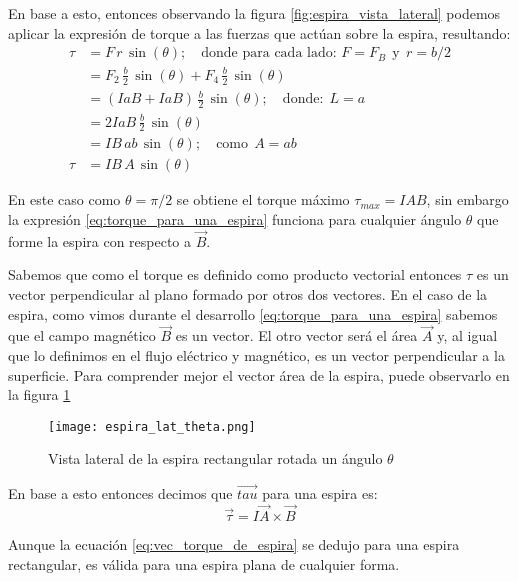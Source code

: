 En base a esto, entonces observando la figura \ref{fig:espira_vista_lateral} podemos aplicar la expresión de torque a las fuerzas que actúan sobre la espira, resultando:
\begin{align}
  \tau &= F \, r \, \sin(\theta); \quad \text{donde para cada lado: } F=F_B ~~\text{y}~~ r=b/2 \nonumber \\ 
       &= F_{2} \, \frac{b}{2}\, \sin(\theta) + F_{4} \, \frac{b}{2}\, \sin(\theta) \nonumber \\
       &= \left(IaB + IaB\right)\, \frac{b}{2} \, \sin(\theta); \quad \text{donde:}~~ L=a \nonumber \\ 
       &= 2IaB \, \frac{b}{2} \, \sin(\theta) \nonumber \\
       &= IB \, ab \, \sin(\theta); \quad \text{como} ~~ A=ab \nonumber \\
  \tau &= IB \, A \, \sin(\theta)
  \label{eq:torque_para_una_espira}
\end{align}

En este caso como \(\theta = \pi/2\) se obtiene el torque máximo \(\tau_{max} = IAB\), sin embargo la expresión \eqref{eq:torque_para_una_espira} funciona para cualquier ángulo \(\theta\) que forme la espira con respecto a \(\vec{B}\). 

Sabemos que como el torque es definido como producto vectorial entonces \(\tau\) es un vector perpendicular al plano formado por otros dos vectores. En el caso de la espira, como vimos durante el desarrollo \eqref{eq:torque_para_una_espira} sabemos que el campo magnético \(\vec{B}\) es un vector. El otro vector será el área \(\vec{A}\) y, al igual que lo definimos en el flujo eléctrico y magnético, es un vector perpendicular a la superficie. Para comprender mejor el vector área de la espira, puede observarlo en la figura \ref{fig:espira_rotada}

\begin{figure}[ht]
  \centering
  \texttt{[image: espira\_lat\_theta.png]}
  \caption{Vista lateral de la espira rectangular rotada un ángulo \(\theta\)}
  \label{fig:espira_rotada}
\end{figure}

En base a esto entonces decimos que \(\vec{tau}\) para una espira es:
\begin{equation}
  \boxed{\vec{\tau} = I\vec{A}\times \vec{B}}
  \label{eq:vec_torque_de_espira}
\end{equation}

Aunque la ecuación \ref{eq:vec_torque_de_espira} se dedujo para una espira rectangular, es válida para una espira plana de cualquier forma.

